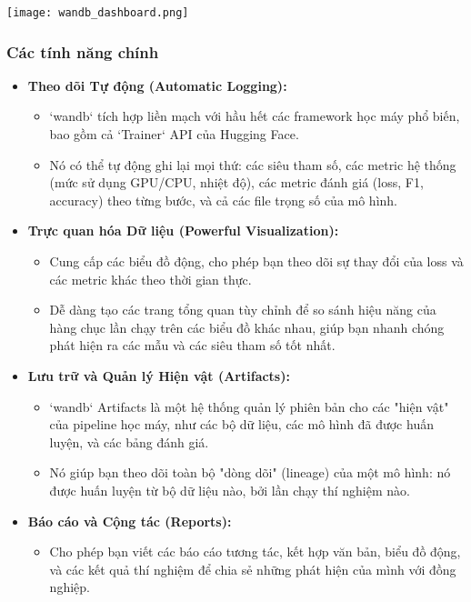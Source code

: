 \begin{center}
    \texttt{[image: wandb\_dashboard.png]}
    \label{fig:wandb_dashboard}
\end{center}

\subsubsection{Các tính năng chính}
\begin{itemize}
    \item \textbf{Theo dõi Tự động (Automatic Logging):}
        \begin{itemize}
            \item `wandb` tích hợp liền mạch với hầu hết các framework học máy phổ biến, bao gồm cả `Trainer` API của Hugging Face.
            \item Nó có thể tự động ghi lại mọi thứ: các siêu tham số, các metric hệ thống (mức sử dụng GPU/CPU, nhiệt độ), các metric đánh giá (loss, F1, accuracy) theo từng bước, và cả các file trọng số của mô hình.
        \end{itemize}
    \item \textbf{Trực quan hóa Dữ liệu (Powerful Visualization):}
        \begin{itemize}
            \item Cung cấp các biểu đồ động, cho phép bạn theo dõi sự thay đổi của loss và các metric khác theo thời gian thực.
            \item Dễ dàng tạo các trang tổng quan tùy chỉnh để so sánh hiệu năng của hàng chục lần chạy trên các biểu đồ khác nhau, giúp bạn nhanh chóng phát hiện ra các mẫu và các siêu tham số tốt nhất.
        \end{itemize}
    \item \textbf{Lưu trữ và Quản lý Hiện vật (Artifacts):}
        \begin{itemize}
            \item `wandb` Artifacts là một hệ thống quản lý phiên bản cho các "hiện vật" của pipeline học máy, như các bộ dữ liệu, các mô hình đã được huấn luyện, và các bảng đánh giá.
            \item Nó giúp bạn theo dõi toàn bộ "dòng dõi" (lineage) của một mô hình: nó được huấn luyện từ bộ dữ liệu nào, bởi lần chạy thí nghiệm nào.
        \end{itemize}
    \item \textbf{Báo cáo và Cộng tác (Reports):}
        \begin{itemize}
            \item Cho phép bạn viết các báo cáo tương tác, kết hợp văn bản, biểu đồ động, và các kết quả thí nghiệm để chia sẻ những phát hiện của mình với đồng nghiệp.
        \end{itemize}
\end{itemize}

